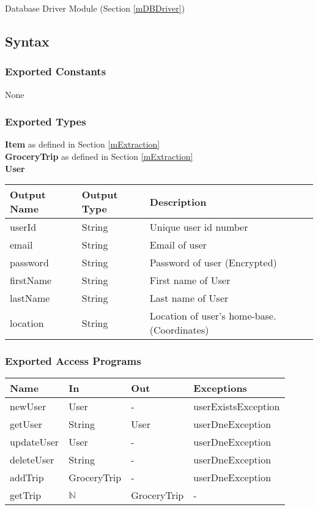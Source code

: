 \documentclass[12pt, titlepage]{article}
\begin{document}
Database Driver Module (Section \ref{mDBDriver}) 

\subsection{Syntax}

\subsubsection{Exported Constants}
None

\subsubsection{Exported Types}
\textbf{Item} as defined in Section \ref{mExtraction} \\

\noindent \textbf{GroceryTrip} as defined in Section \ref{mExtraction} \\

\noindent \textbf{User}

\begin{table}[H]
  \begin{tabular}{|p{}|p{}|p{}|}
    \hline
    \textbf{Output Name} & \textbf{Output Type} & \textbf{Description} \\
    \hline
    userId & String & Unique user id number \\
    \hline
    email & String & Email of user \\
    \hline
    password & String & Password of user (Encrypted) \\
    \hline
    firstName & String & First name of User \\
    \hline
    lastName & String & Last name of User \\
    \hline
    location & String & Location of user's home-base. (Coordinates) \\
    \hline
  \end{tabular}
\end{table}

\subsubsection{Exported Access Programs}

\begin{center}
\begin{tabular}{p{5cm} p{3cm} p{3cm} p{5cm}}
\hline
\textbf{Name} & \textbf{In} & \textbf{Out} & \textbf{Exceptions} \\
\hline
newUser & User & - & userExistsException \\
getUser & String & User & userDneException \\
updateUser & User & - & userDneException \\
deleteUser & String & - & userDneException \\
addTrip & GroceryTrip & - & userDneException \\
getTrip & $\mathbb{N}$ & GroceryTrip & - \\
\hline
\end{tabular}
\end{center}
\end{document}
